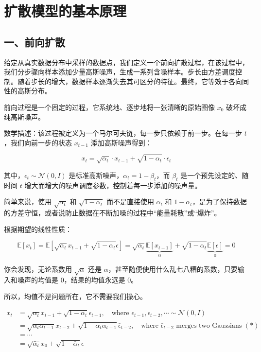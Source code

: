 \setcounter{section}{0}

\hypertarget{ux6269ux6563ux6a21ux578bux7684ux57faux672cux539fux7406}{%
\section{扩散模型的基本原理}\label{ux6269ux6563ux6a21ux578bux7684ux57faux672cux539fux7406}}

\hypertarget{ux4e00ux524dux5411ux6269ux6563}{%
\subsection{一、前向扩散}\label{ux4e00ux524dux5411ux6269ux6563}}

给定从真实数据分布中采样的数据点，我们定义一个前向扩散过程，在该过程中，我们分步骤向样本添加少量高斯噪声，生成一系列含噪样本。步长由方差调度控制。随着步长的增大，数据样本逐渐失去其可区分的特征。最终，它等效于各向同性的高斯分布。

前向过程是一个固定的过程，它系统地、逐步地将一张清晰的原始图像 \(x_0\) 破坏成纯高斯噪声。

数学描述：该过程被定义为一个马尔可夫链，每一步只依赖于前一步。在每一步 \(t\)，我们向前一步的状态 \(x_{t-1}\) 添加高斯噪声得到：

\[
x_t = \sqrt{\alpha_t}\cdot x_{t-1} + \sqrt{1-\alpha_t}\cdot \epsilon_t
\]

其中，\(\epsilon_t \sim \mathcal{N}(0, I)\) 是标准高斯噪声，\(\alpha_t = 1-\beta_t\)，而 \(\beta_t\) 是一个预先设定的、随时间 \(t\) 增大而增大的噪声调度参数，控制着每一步添加的噪声量。

简单来说，使用 \(\sqrt{\alpha_t}\) 和 \(\sqrt{1-\alpha_t}\) 而不是直接使用 \(\alpha_t\) 和 \(1-\alpha_t\)，是为了保持数据的方差守恒，或者说防止数据在不断加噪的过程中``能量耗散''或``爆炸''。

根据期望的线性性质：

\[
\mathbb{E}[x_t]
= \mathbb{E}\left[\sqrt{\alpha_t}x_{t-1}+\sqrt{1-\alpha_t}\epsilon\right]
= \sqrt{\alpha_t}\underbrace{\mathbb{E}[x_{t-1}]}_{0}
+ \sqrt{1-\alpha_t}\underbrace{\mathbb{E}[\epsilon]}_{0}
= 0
\]

你会发现，无论系数用 \(\sqrt{\alpha}\) 还是 \(\alpha\)，甚至随便使用什么乱七八糟的系数，只要输入和噪声的均值是 \(0\)，结果的均值永远是 \(0\)。

所以，均值不是问题所在，它不需要我们操心。

\[
\begin{aligned}
x_t
&= \sqrt{\alpha_t}x_{t-1} + \sqrt{1-\alpha_t}\epsilon_{t-1},
\quad \text{where } \epsilon_{t-1},\epsilon_{t-2},\cdots \sim \mathcal{N}(0,I) \\
&= \sqrt{\alpha_t\alpha_{t-1}}x_{t-2}
 + \sqrt{1-\alpha_t\alpha_{t-1}}\bar{\epsilon}_{t-2},
\quad \text{where } \bar{\epsilon}_{t-2} \text{ merges two Gaussians } (*) \\
&= \cdots \\
&= \sqrt{\bar{\alpha}_t}x_0+\sqrt{1-\bar{\alpha}_t}\epsilon
\end{aligned}
\]

